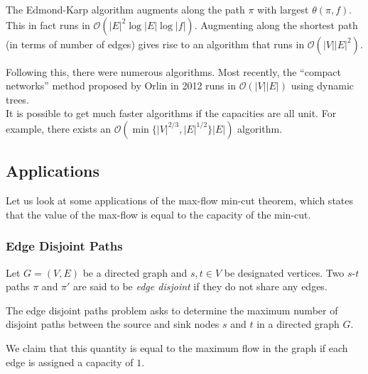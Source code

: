 	The Edmond-Karp algorithm augments along the path $\pi$ with largest $\theta(\pi, f)$. This in fact runs in $\mathcal{O}(|E|^2\log |E| \log |f|)$. Augmenting along the shortest path (in terms of number of edges) gives rise to an algorithm that runs in $\mathcal{O}(|V||E|^2)$.

	Following this, there were numerous algorithms. Most recently, the ``compact networks'' method proposed by Orlin in 2012 runs in $\mathcal{O}(|V||E|)$ using dynamic trees.\\
	It is possible to get much faster algorithms if the capacities are all unit. For example, there exists an $\mathcal{O}(\min\{|V|^{2/3}, |E|^{1/2}\}|E|)$ algorithm.

\subsection{Applications}

	Let us look at some applications of the max-flow min-cut theorem, which states that the value of the max-flow is equal to the capacity of the min-cut.

	\subsubsection{Edge Disjoint Paths}
	\label{subsubsec: edge-disjoint paths}

		Let $G=(V,E)$ be a directed graph and $s,t\in V$ be designated vertices. Two $s$-$t$ paths $\pi$ and $\pi'$ are said to be \textit{edge disjoint} if they do not share any edges.

		The edge disjoint paths problem asks to determine the maximum number of disjoint paths between the source and sink nodes $s$ and $t$ in a directed graph $G$.

		We claim that this quantity is equal to the maximum flow in the graph if each edge is assigned a capacity of $1$.

